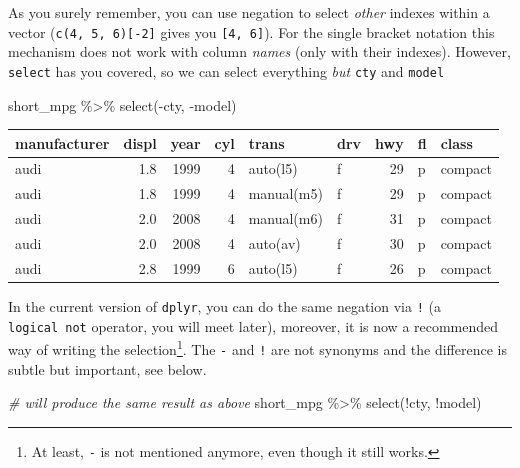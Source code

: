 \documentclass[
]{book}
\newenvironment{Shaded}{\begin{snugshade}}{\end{snugshade}}
\newcommand{\CommentTok}[1]{\textcolor[rgb]{0.56,0.35,0.01}{\textit{#1}}}
\newcommand{\FunctionTok}[1]{\textcolor[rgb]{0.00,0.00,0.00}{#1}}
\newcommand{\NormalTok}[1]{#1}
\newcommand{\SpecialCharTok}[1]{\textcolor[rgb]{0.00,0.00,0.00}{#1}}
\begin{document}
As you surely remember, you can use negation to select \emph{other} indexes within a vector (\texttt{c(4,\ 5,\ 6){[}-2{]}} gives you \texttt{{[}4,\ 6{]}}). For the single bracket notation this mechanism does not work with column \emph{names} (only with their indexes). However, \texttt{select} has you covered, so we can select everything \emph{but} \texttt{cty} and \texttt{model}

\begin{Shaded}
\begin{Highlighting}[]
\NormalTok{short\_mpg }\SpecialCharTok{\%\textgreater{}\%}
  \FunctionTok{select}\NormalTok{(}\SpecialCharTok{{-}}\NormalTok{cty, }\SpecialCharTok{{-}}\NormalTok{model)}
\end{Highlighting}
\end{Shaded}

\begin{tabular}{l|r|r|r|l|l|r|l|l}
\hline
manufacturer & displ & year & cyl & trans & drv & hwy & fl & class\\
\hline
audi & 1.8 & 1999 & 4 & auto(l5) & f & 29 & p & compact\\
\hline
audi & 1.8 & 1999 & 4 & manual(m5) & f & 29 & p & compact\\
\hline
audi & 2.0 & 2008 & 4 & manual(m6) & f & 31 & p & compact\\
\hline
audi & 2.0 & 2008 & 4 & auto(av) & f & 30 & p & compact\\
\hline
audi & 2.8 & 1999 & 6 & auto(l5) & f & 26 & p & compact\\
\hline
\end{tabular}

In the current version of \texttt{dplyr}, you can do the same negation via \texttt{!} (a \texttt{logical\ not} operator, you will meet later), moreover, it is now a recommended way of writing the selection\footnote{At least, \texttt{-} is not mentioned anymore, even though it still works.}. The \texttt{-} and \texttt{!} are not synonyms and the difference is subtle but important, see below.

\begin{Shaded}
\begin{Highlighting}[]
\CommentTok{\# will produce the same result as above}
\NormalTok{short\_mpg }\SpecialCharTok{\%\textgreater{}\%}
  \FunctionTok{select}\NormalTok{(}\SpecialCharTok{!}\NormalTok{cty, }\SpecialCharTok{!}\NormalTok{model)}
\end{Highlighting}
\end{Shaded}
\end{document}
